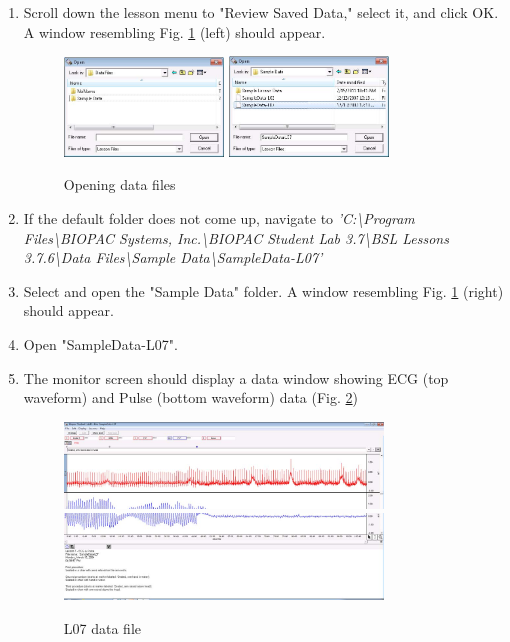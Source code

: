 \documentclass{article}
\begin{document}
\begin{enumerate}
	\item Scroll down the lesson menu to "Review Saved Data," select it, and click OK. A window resembling Fig. \ref{open_data} (left) should appear.
	
		\begin{figure}[h]
		\includegraphics[width=0.4\textwidth]{../images/BIOPAC_4a.jpg}
		\includegraphics[width=0.4\textwidth]{../images/BIOPAC_4b.jpg}
		\centering
		\caption{Opening data files}
		\label{open_data}
		\end{figure}
	
	\item If the default folder does not come up, navigate to \textit{'C:\textbackslash Program Files\textbackslash BIOPAC Systems, Inc.\textbackslash BIOPAC Student Lab 3.7\textbackslash BSL Lessons 3.7.6\textbackslash Data Files\textbackslash Sample Data\textbackslash SampleData-L07'}
	\item Select and open the "Sample Data" folder. A window resembling Fig. \ref{open_data} (right) should appear.
	\item Open "SampleData-L07".
	\item The monitor screen should display a data window showing ECG (top waveform) and Pulse (bottom waveform) data (Fig. \ref{sample_data})
	
		\begin{figure}[h]
		\includegraphics[width=0.8\textwidth]{../images/BIOPAC_5a.jpg}
		\includegraphics[width=0.8\textwidth]{../images/BIOPAC_5b.jpg}
		\centering
		\caption{L07 data file}
		\label{sample_data}
		\end{figure}
	
\end{enumerate}
\end{document}

